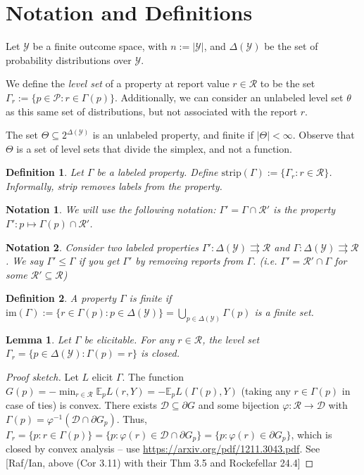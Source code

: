 \documentclass[12pt]{article}
\newcommand{\Comments}{1}
\newcommand{\mynote}[2]{\ifnum\Comments=1\textcolor{#1}{#2}\fi}
\newcommand{\jessie}[1]{\mynote{purple}{[JF: #1]}}
\newcommand{\D}{\mathcal{D}}
\newcommand{\E}{\mathbb{E}}
\renewcommand{\P}{\mathcal{P}}
\newcommand{\R}{\mathcal{R}}
\newcommand{\Y}{\mathcal{Y}}
\newcommand{\toto}{\rightrightarrows}
\newcommand{\im}{\text{im}}
\newtheorem{lemma}{Lemma}
\newtheorem{definition}{Definition}
\newtheorem{notation}{Notation}
\begin{document}
\section{Notation and Definitions}

Let $\Y$ be a finite outcome space, with $n:=|\Y|$, and $\Delta(\Y)$ be the set of probability distributions over $\Y$.

We define the \emph{level set} of a property at report value $r\in\R$ to be the set $\Gamma_r := \{p\in\P : r \in \Gamma(p)\}$.
Additionally, we can consider an unlabeled level set $\theta$ as this same set of distributions, but not associated with the report $r$.

The set $\Theta \subseteq 2^{\Delta(\Y)}$ is an unlabeled property, and finite if $|\Theta| < \infty$.
Observe that $\Theta$ is a set of level sets that divide the simplex, and not a function.

\begin{definition}
Let $\Gamma$ be a labeled property.
Define $\text{strip}(\Gamma) := \{ \Gamma_r : r \in \R \}$.
Informally, strip removes labels from the property.
\end{definition}

\begin{notation}
We will use the following notation: $\Gamma' = \Gamma \cap \R'$ is the property $\Gamma' : p \mapsto \Gamma(p) \cap \R'$.  
\end{notation}


\begin{notation}
  Consider two labeled properties $\Gamma' : \Delta(\Y) \toto \R$ and $\Gamma : \Delta(\Y) \toto \R$.
  We say $\Gamma' \leq \Gamma$ if you get $\Gamma'$ by removing reports from $\Gamma$.
  (i.e. $\Gamma' = \R' \cap \Gamma$ for some $\R' \subseteq \R$)
\end{notation}

\begin{definition}
A property $\Gamma$ is \emph{finite} if $\im(\Gamma) := \{r\in\Gamma(p) : p\in\Delta(\Y)\} = \bigcup_{p\in\Delta(\Y)} \Gamma(p)$ is a finite set.
\end{definition}

\begin{lemma}\label{conj:closed-level-sets}
  Let $\Gamma$ be elicitable.
  For any $r\in\R$, the level set $\Gamma_r = \{ p \in \Delta(\Y) : \Gamma(p) = r \}$ is closed.
\end{lemma}
\begin{proof}[Proof sketch]
  Let $L$ elicit $\Gamma$.
  The function $G(p) = -\min_{r\in\R} \E_p L(r,Y) = -\E_p L(\Gamma(p),Y)$ (taking any $r\in\Gamma(p)$ in case of ties) is convex.
  There exists $\D \subseteq \partial G$ and some bijection $\varphi : \R \to \D$ with $\Gamma(p) = \varphi^{-1}(\D\cap \partial G_p)$.
  Thus, $\Gamma_r = \{p : r\in\Gamma(p)\} = \{p : \varphi(r) \in \D\cap\partial G_p\} = \{p : \varphi(r) \in \partial G_p\}$, which is closed by convex analysis -- use \url{https://arxiv.org/pdf/1211.3043.pdf}.
	See [Raf/Ian, above (Cor 3.11) with their Thm 3.5 and Rockefellar 24.4]  
\end{proof}
\end{document}
